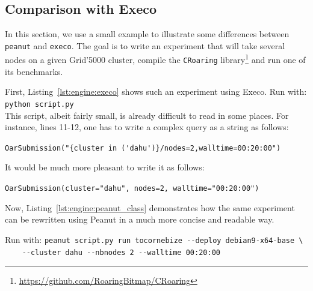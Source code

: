         \subsection{Comparison with Execo}%
        \label{sub:comparison_with_execo}

            In this section, we use a small example to illustrate some differences between \texttt{peanut} and
            \texttt{execo}. The goal is to write an experiment that will take several nodes on a given Grid'5000
            cluster, compile the \texttt{CRoaring} library\footnote{\url{https://github.com/RoaringBitmap/CRoaring}} and
            run one of its benchmarks.

            \lstset{basicstyle=\scriptsize, style=custom_lst_style}

            First, Listing~\ref{lst:engine:execo} shows such an experiment using Execo. Run with: \verb#python script.py#\\

            

            This script, albeit fairly small, is already difficult to read in some places. For instance, lines 11-12,
            one has to write a complex query as a string as follows:

            \verb#OarSubmission("{cluster in ('dahu')}/nodes=2,walltime=00:20:00")#

            It would be much more pleasant to write it as follows:

            \verb#OarSubmission(cluster="dahu", nodes=2, walltime="00:20:00")#

            Now, Listing~\ref{lst:engine:peanut_class} demonstrates how the same experiment can be rewritten using Peanut
            in a much more concise and readable way.

            Run with: \verb#peanut script.py run tocornebize --deploy debian9-x64-base \#\\
            \verb#    --cluster dahu --nbnodes 2 --walltime 00:20:00#

            

